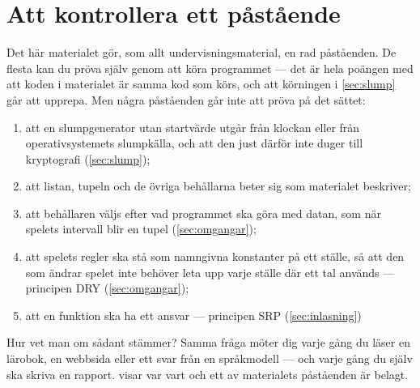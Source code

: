 \chapter{Att kontrollera ett påstående}
\label{app:verifiera-gissning}

Det här materialet gör, som allt undervisningsmaterial, en rad
påståenden.  De flesta kan du pröva själv genom att köra programmet ---
det är hela poängen med att koden i materialet är samma kod som körs, och
att körningen i \cref{sec:slump} går att upprepa.  Men några påståenden
går inte att pröva på det sättet:
\begin{enumerate}
  \item att en slumpgenerator utan startvärde utgår från klockan eller
    från operativsystemets slumpkälla, och att den just därför inte
    duger till kryptografi (\cref{sec:slump});
  \item att listan, tupeln och de övriga behållarna beter sig som
    materialet beskriver;
  \item att behållaren väljs efter vad programmet ska göra med datan,
    som när spelets intervall blir en tupel (\cref{sec:omgangar});
  \item att spelets regler ska stå som namngivna konstanter på ett
    ställe, så att den som ändrar spelet inte behöver leta upp varje
    ställe där ett tal används --- principen
    \foreignlanguage{english}{DRY} (\cref{sec:omgangar});
  \item att en funktion ska ha ett ansvar --- principen
    \foreignlanguage{english}{SRP} (\cref{sec:inlasning})%
\end{enumerate}
Hur vet man om sådant stämmer?  Samma fråga möter dig varje gång du läser
en lärobok, en webbsida eller ett svar från en språkmodell --- och varje
gång du själv ska skriva en rapport.
 visar var vart och ett av materialets
påståenden är belagt.

